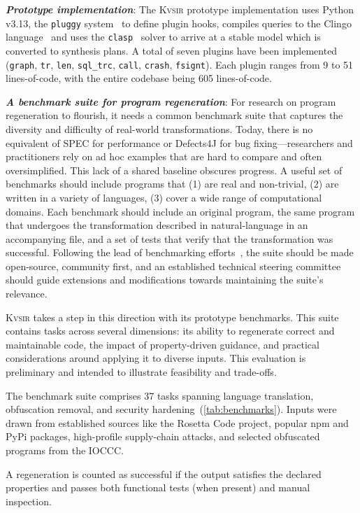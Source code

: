 \documentclass[sigplan,review,anonymous,10pt]{acmart}
\newcommand{\sys}{{\scshape Kv{\textalpha}sir}\xspace}
\newcommand{\heading}[1]{\vspace{2pt}\noindent\textbf{\emph{#1}}:\enspace}
\newcommand{\ttt}[1]{\texttt{#1}\xspace}
\begin{document}
\heading{Prototype implementation}
The \sys prototype implementation uses Python v3.13,
the \ttt{pluggy} system~\cite{pluggy} to define plugin hooks,
compiles queries to the Clingo language~\cite{DBLP:journals/corr/GebserKKS14} and uses the \ttt{clasp}~\cite{gebser2007clasp}
solver to arrive at a stable model which is converted to synthesis plans. 
A total of seven plugins have been implemented (\ttt{graph}, \ttt{tr}, \ttt{len}, \ttt{sql\_trc}, \ttt{call}, \ttt{crash}, \ttt{fsignt}).
Each plugin ranges from 9 to 51 lines-of-code,
with the entire codebase being 605 lines-of-code.

\heading{A benchmark suite for program regeneration}
For research on program regeneration to flourish, it needs a common benchmark
suite that captures the diversity and difficulty of real-world transformations.
Today, there is no equivalent of SPEC for performance or Defects4J for bug
fixing---researchers and practitioners rely on ad hoc examples that are hard to compare and often
oversimplified.
This lack of a shared baseline obscures progress. 
A useful set of benchmarks should include
programs that
(1) are real and non-trivial,
(2) are written in a variety of languages, 
(3) cover a wide range of computational domains.
Each benchmark should include an original program, 
the same program that undergoes the transformation described in natural-language 
in an accompanying file, and a set of tests that verify that the transformation was successful.
Following the lead of benchmarking efforts~\cite{SPEC_CPU2017, dacapo2006, koala:atc:2025}, the suite should be made open-source, community 
first, and an established technical steering committee should guide extensions and modifications towards maintaining the suite's relevance.

\sys takes a step in this direction with its prototype benchmarks.
This suite contains tasks across several dimensions: its
ability to regenerate correct and maintainable
code, the impact of property-driven guidance,
and practical considerations around applying it
to diverse inputs. This evaluation is
preliminary and intended to illustrate
feasibility and trade-offs.

The benchmark suite comprises 37 tasks spanning language translation, obfuscation
removal, and security hardening~(\cref{tab:benchmarks}).
Inputs were drawn from established sources
like the Rosetta Code project, popular npm and PyPi packages, high-profile supply-chain attacks,
and selected obfuscated programs from the IOCCC.

A regeneration is counted as successful if the output satisfies the declared
properties and passes both functional tests (when present) and manual inspection.
\end{document}

